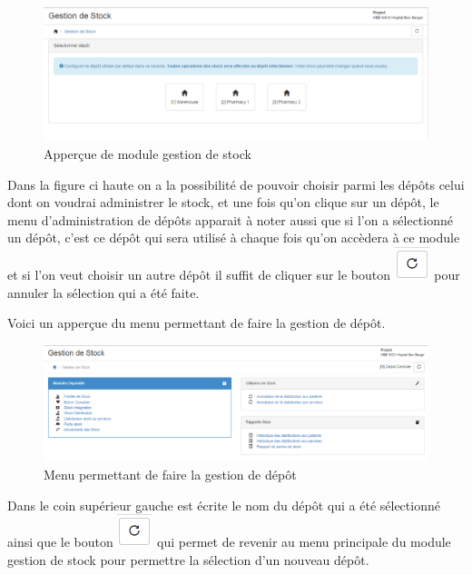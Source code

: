 \documentclass[12pt,a4paper]{report}
\begin{document}
\begin{figure}[h]
\begin{center}
\includegraphics[width=12cm]{pic/MenuGestStock.png}
\end{center}
\caption{Apperçue de module gestion de stock}
\label{Apperçue de module gestion de stock}
\end{figure}

Dans la figure ci haute on a la possibilité de pouvoir choisir parmi les dépôts celui dont on voudrai administrer le stock, et une fois qu'on clique sur un dépôt, le menu d'administration de dépôts apparait à noter aussi que si l'on a sélectionné un dépôt, c'est ce dépôt qui sera utilisé à chaque fois qu'on accèdera à ce module et si l'on veut choisir un autre dépôt il suffit de cliquer sur le bouton \includegraphics[scale=0.7]{pic/refresh.png} pour annuler la sélection qui a été faite.

Voici un apperçue du menu permettant de faire la gestion de dépôt.

\begin{figure}[h]
\begin{center}
\includegraphics[width=12cm]{pic/MenuStock.png}
\end{center}
\caption{Menu permettant de faire la gestion de dépôt}
\label{Menu permettant de faire la gestion de dépôt}
\end{figure}

Dans le coin supérieur gauche est écrite le nom du dépôt qui a été sélectionné ainsi que le bouton \includegraphics[scale=0.7]{pic/refresh.png} qui permet de revenir au menu principale du module gestion de stock pour permettre la sélection d'un nouveau dépôt.
\end{document}
